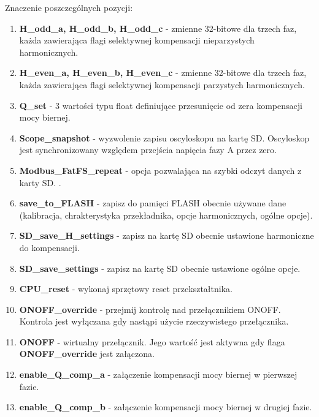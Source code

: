 \documentclass[12pt,a4paper]{article}
\begin{document}
Znaczenie poszczególnych pozycji:
\begin{enumerate}
	\setlength\itemsep{0mm}
	\item \textbf{H\_odd\_a, H\_odd\_b, H\_odd\_c} - zmienne 32-bitowe dla trzech faz, każda zawierająca flagi selektywnej kompensacji nieparzystych harmonicznych.

	\item \textbf{H\_even\_a, H\_even\_b, H\_even\_c} - zmienne 32-bitowe dla trzech faz, każda zawierająca flagi selektywnej kompensacji parzystych harmonicznych.
		
	\item \textbf{Q\_set} - 3 wartości typu float definiujące przesunięcie od zera kompensacji mocy biernej.
	
	\item \textbf{Scope\_snapshot} - wyzwolenie zapisu oscyloskopu na kartę SD. Oscyloskop jest synchronizowany względem przejścia napięcia fazy A przez zero.
	
	\item \textbf{Modbus\_FatFS\_repeat} - opcja pozwalająca na szybki odczyt danych z karty SD. .
	
	\item \textbf{save\_to\_FLASH} - zapisz do pamięci FLASH obecnie używane dane (kalibracja, chrakterystyka przekładnika, opcje harmonicznych, ogólne opcje).
	
	\item \textbf{SD\_save\_H\_settings} - zapisz na kartę SD obecnie ustawione harmoniczne do kompensacji.
	
	\item \textbf{SD\_save\_settings} - zapisz na kartę SD obecnie ustawione ogólne opcje.
	
	\item \textbf{CPU\_reset} - wykonaj sprzętowy reset przekształtnika.
	
	\item \textbf{ONOFF\_override} - przejmij kontrolę nad przełącznikiem ONOFF. Kontrola jest wyłączana gdy nastąpi użycie rzeczywistego przełącznika.
	
	\item \textbf{ONOFF} - wirtualny przełącznik. Jego wartość jest aktywna gdy flaga \textbf{ONOFF\_override} jest załączona.
	
	\item \textbf{enable\_Q\_comp\_a} - załączenie kompensacji mocy biernej w pierwszej fazie.
	
	\item \textbf{enable\_Q\_comp\_b} - załączenie kompensacji mocy biernej w drugiej fazie.
	

\end{enumerate}
\end{document}
